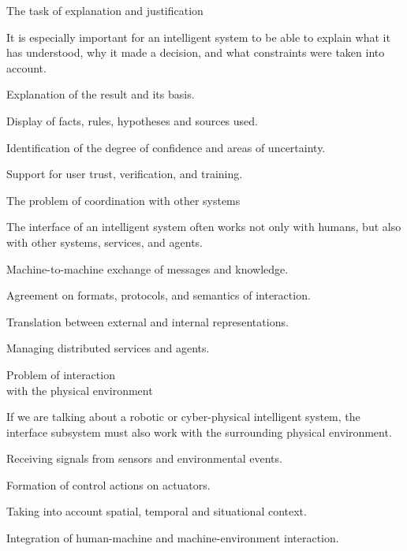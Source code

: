 \begin{frame}{The task of explanation and justification}
	\topline
	\justifying
	
	It is especially important for an intelligent system to be able to explain what it has understood, why it made a decision, and what constraints were taken into account.
	
	\begin{textitemize}
		\item Explanation of the result and its basis.
		\item Display of facts, rules, hypotheses and sources used.
		\item Identification of the degree of confidence and areas of uncertainty.
		\item Support for user trust, verification, and training.
	\end{textitemize}
\end{frame}

\begin{frame}{The problem of coordination with other systems}
	\topline
	\justifying
	
	The interface of an intelligent system often works not only with humans, but also with other systems, services, and agents.
	
	\begin{textitemize}
		\item Machine-to-machine exchange of messages and knowledge.
		\item Agreement on formats, protocols, and semantics of interaction.
		\item Translation between external and internal representations.
		\item Managing distributed services and agents.
	\end{textitemize}
\end{frame}

\begin{frame}{Problem of interaction\\ with the physical environment}
	\topline
	\justifying
	
	If we are talking about a robotic or cyber-physical intelligent system, the interface subsystem must also work with the surrounding physical environment.
	
	\begin{textitemize}
		\item Receiving signals from sensors and environmental events.
		\item Formation of control actions on actuators.
		\item Taking into account spatial, temporal and situational context.
		\item Integration of human-machine and machine-environment interaction.
	\end{textitemize}
\end{frame}

